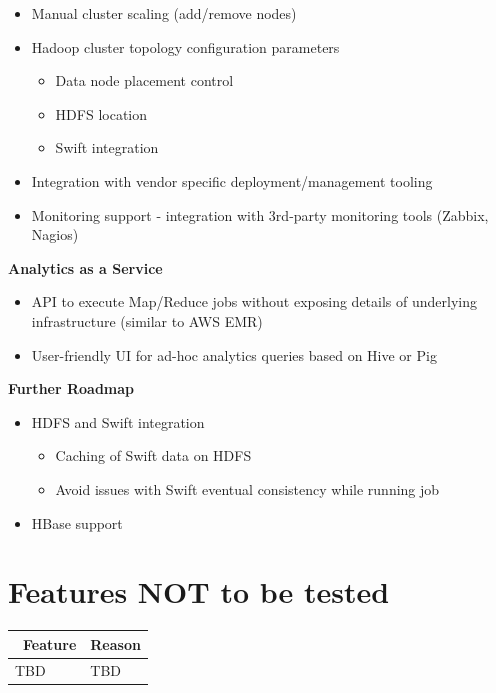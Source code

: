 \documentclass[a4paper,11pt]{article}
\begin{document}
\begin{itemize}
    \item Manual cluster scaling (add/remove nodes)
    \item Hadoop cluster topology configuration parameters
	\begin{itemize}
    		\item Data node placement control
        \item HDFS location
        \item Swift integration
    \end{itemize}

    \item Integration with vendor specific deployment/management tooling
    \item Monitoring support - integration with 3rd-party monitoring tools (Zabbix, Nagios)
\end{itemize}
\textbf{Analytics as a Service}

\begin{itemize}
    \item API to execute Map/Reduce jobs without exposing details of underlying infrastructure (similar to AWS EMR)
    \item User-friendly UI for ad-hoc analytics queries based on Hive or Pig
\end{itemize}
\textbf{Further Roadmap}
\begin{itemize}
    \item HDFS and Swift integration
	\begin{itemize}
    		\item Caching of Swift data on HDFS
        \item Avoid issues with Swift eventual consistency while running job
	\end{itemize}
    \item HBase support
\end{itemize}





\section{Features NOT to be tested}

\begin{tabular}{|p{5cm}|p{10cm}|}
\hline
\ \bf Feature & \bf Reason \\ \hline
TBD&TBD \\ \hline
\end{tabular}
\end{document}
